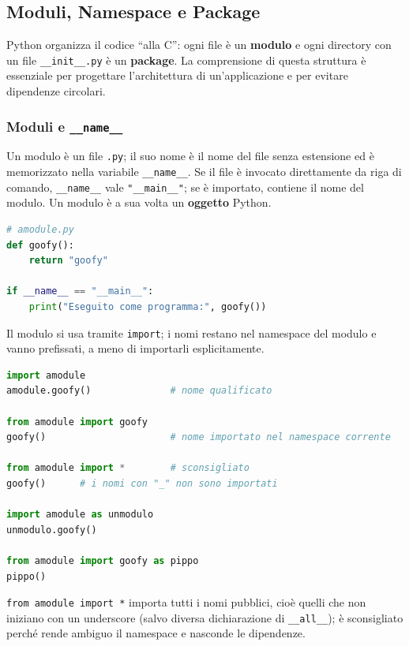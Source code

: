 \documentclass[12pt]{extarticle}
\begin{document}
\subsection{Moduli, Namespace e Package}

\noindent Python organizza il codice ``alla C'': ogni file è un \textbf{modulo} e ogni directory con un file \texttt{\_\_init\_\_.py} è un \textbf{package}. La comprensione di questa struttura è essenziale per progettare l'architettura di un'applicazione e per evitare dipendenze circolari.

\subsubsection{Moduli e \texttt{\_\_name\_\_}}

\noindent Un modulo è un file \texttt{.py}; il suo nome è il nome del file senza estensione ed è memorizzato nella variabile \texttt{\_\_name\_\_}. Se il file è invocato direttamente da riga di comando, \texttt{\_\_name\_\_} vale \texttt{"\_\_main\_\_"}; se è importato, contiene il nome del modulo. Un modulo è a sua volta un \textbf{oggetto} Python.

\begin{lstlisting}[language=Python]
# amodule.py
def goofy():
    return "goofy"

if __name__ == "__main__":
    print("Eseguito come programma:", goofy())
\end{lstlisting}

\noindent Il modulo si usa tramite \texttt{import}; i nomi restano nel namespace del modulo e vanno prefissati, a meno di importarli esplicitamente.

\begin{lstlisting}[language=Python]
import amodule
amodule.goofy()              # nome qualificato

from amodule import goofy
goofy()                      # nome importato nel namespace corrente

from amodule import *        # sconsigliato
goofy()      # i nomi con "_" non sono importati

import amodule as unmodulo
unmodulo.goofy()

from amodule import goofy as pippo
pippo()
\end{lstlisting}

\noindent \texttt{from amodule import *} importa tutti i nomi pubblici, cioè quelli che non iniziano con un underscore (salvo diversa dichiarazione di \texttt{\_\_all\_\_}); è sconsigliato perché rende ambiguo il namespace e nasconde le dipendenze.
\end{document}

